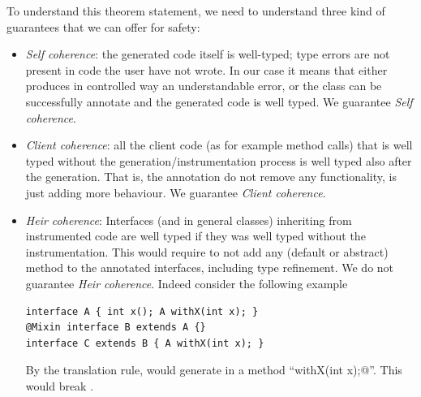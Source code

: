 To understand this theorem statement, we need to understand three kind of guarantees that we can offer for safety:
\begin{itemize}
\item \textit{Self coherence}: the generated code itself is well-typed; type errors are not present in code the user have not wrote.
In our case it means that either \mixin{} produces in controlled way an understandable error, or the class can be successfully annotate and the generated code is well typed.
We guarantee \textit{Self coherence}.

\item \textit{Client coherence}: all the client code (as for example method calls) that is well typed without the generation/instrumentation process is well typed also after the generation.
That is, the annotation do not remove any functionality, is just
adding more behaviour.
We guarantee \textit{Client coherence}.

\item \textit{Heir coherence}: Interfaces (and in general classes) inheriting from instrumented code are well typed if they was well typed without the instrumentation.
This would require to not add any (default or abstract) method to the annotated interfaces, including type refinement.
We do not guarantee \textit{Heir coherence}.
Indeed consider the following example

\begin{lstlisting}
interface A { int x(); A withX(int x); }
@Mixin interface B extends A {}
interface C extends B { A withX(int x); }
\end{lstlisting}

By the translation rule, \mixin would  generate in \Q@B@  a method ``\Q@B withX(int x);@''.
This would break \Q@C@.

\end{itemize}


